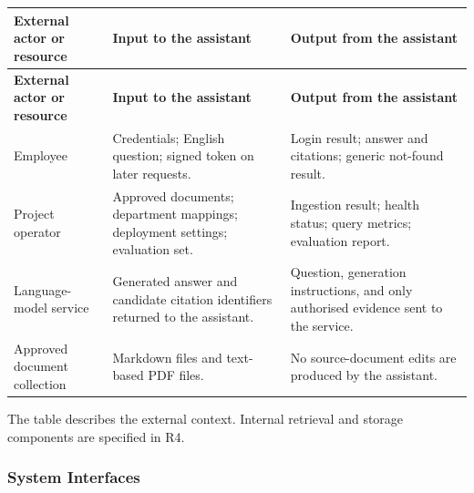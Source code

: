 \documentclass[11pt,letterpaper]{article}
\begin{document}
\begin{longtable}{|P{\arrayrulewidth\relax}|P{\arrayrulewidth\relax}|P{\arrayrulewidth\relax}|}

\hline{}

\textbf{External actor or resource} & \textbf{Input to the assistant} & \textbf{Output from the assistant} \\ \hline

\endfirsthead

\hline{}

\textbf{External actor or resource} & \textbf{Input to the assistant} & \textbf{Output from the assistant} \\ \hline

\endhead

\hline\endfoot

\hline\endlastfoot

Employee & Credentials; English question; signed token on later requests. & Login result; answer and citations; generic not-found result. \\ \hline

Project operator & Approved documents; department mappings; deployment settings; evaluation set. & Ingestion result; health status; query metrics; evaluation report. \\ \hline

Language-model service & Generated answer and candidate citation identifiers returned to the assistant. & Question, generation instructions, and only authorised evidence sent to the service. \\ \hline

Approved document collection & Markdown files and text-based PDF files. & No source-document edits are produced by the assistant. \\ \hline

\end{longtable}

\endgroup

The table describes the external context. Internal retrieval and storage components are specified in R4.\par

\subsubsection{System Interfaces}
\end{document}
